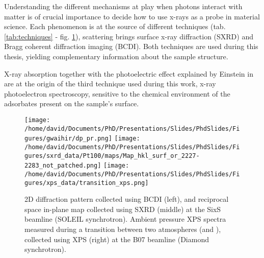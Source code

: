 Understanding the different mechanisms at play when photons interact with matter is of crucial importance to decide how to use x-rays as a probe in material science.
Each phenomenon is at the source of different techniques (tab. \ref{tab:techniques} - fig. \ref{fig:TechniquesDataExamples}), scattering brings surface x-ray diffraction (SXRD) and Bragg coherent diffraction imaging (BCDI).
Both techniques are used during this thesis, yielding complementary information about the sample structure.

X-ray absorption together with the photoelectric effect explained by Einstein in \cite*{Einstein1905} are at the origin of the third technique used during this work, x-ray photoelectron spectroscopy, sensitive to the chemical environment of the adsorbates present on the sample's surface.

\begin{table}[!htb]
\centering
{}
    \caption{
        X-ray techniques carried out in the frame of this thesis.
    }
    \label{tab:techniques}
\end{table}

\begin{figure}[!htb]
    \centering
    \texttt{[image: /home/david/Documents/PhD/Presentations/Slides/PhdSlides/Figures/gwaihir/dp\_pr.png]}
    \texttt{[image: /home/david/Documents/PhD/Presentations/Slides/PhdSlides/Figures/sxrd\_data/Pt100/maps/Map\_hkl\_surf\_or\_2227-2283\_not\_patched.png]}
    \texttt{[image: /home/david/Documents/PhD/Presentations/Slides/PhdSlides/Figures/xps\_data/transition\_xps.png]}
    \caption{
    2D diffraction pattern collected using BCDI (left), and reciprocal space in-plane map collected using SXRD (middle) at the SixS beamline (SOLEIL synchrotron).
    Ambient pressure XPS spectra measured during a transition between two atmospheres (\argon  and \dioxygen), collected using XPS (right) at the B07 beamline (Diamond synchrotron).
    }
    \label{fig:TechniquesDataExamples}
\end{figure}

